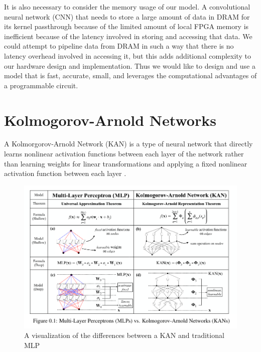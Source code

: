 \documentclass[psamsfonts]{amsart}
\theoremstyle{definition}
\theoremstyle{remark}
\numberwithin{equation}{section}
\begin{document}
It is also necessary to consider the memory usage of our model. A convolutional neural network (CNN) that needs to store a large amount of data in DRAM for its kernel passthrough because of the limited amount of local FPGA memory is inefficient because of the latency involved in storing and accessing that data. We could attempt to pipeline data from DRAM in such a way that there is no latency overhead involved in accessing it, but this adds additional complexity to our hardware design and implementation. Thus we would like to design and use a model that is fast, accurate, small, and leverages the computational advantages of a programmable circuit.

\section{Kolmogorov-Arnold Networks}
A Kolmorgorov-Arnold Network (KAN) is a type of neural network that directly learns nonlinear activation functions between each layer of the network rather than learning weights for linear transformations and applying a fixed nonlinear activation function between each layer \cite{kan}.

\begin{figure}[H]
  \centering
  \includegraphics[scale=0.5]{mlpkan.png}
  \caption{A visualization of the differences between a KAN and traditional MLP \cite{kan}}
\end{figure}
\end{document}
